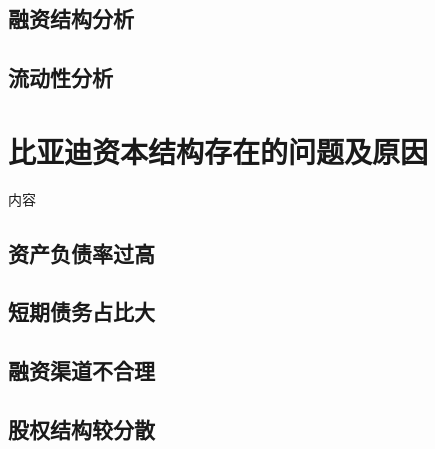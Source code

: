 \subsection{融资结构分析}


\subsection{流动性分析}


\section{比亚迪资本结构存在的问题及原因}

内容

\subsection{资产负债率过高}

\subsection{短期债务占比大}

\subsection{融资渠道不合理}

\subsection{股权结构较分散}


